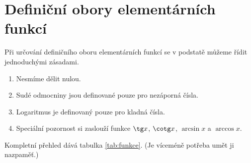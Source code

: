 \section*{Definiční obory elementárních funkcí}

Při určování definičního oboru elementárních funkcí se v podstatě můžeme řídit jednoduchými zásadami.

\begin{enumerate}
    \item Nesmíme dělit nulou.
    \item Sudé odmocniny jsou definované pouze pro nezáporná čísla.
    \item Logaritmus je definovaný pouze pro kladná čísla.
    \item Speciální pozornost si zaslouží funkce $\tg x$, $\cotg x$, $\arcsin x $ a $\arccos x$.
\end{enumerate}

Kompletní přehled dává tabulka \ref{tab:funkce}. (Je víceméně potřeba umět ji nazpaměť.)

